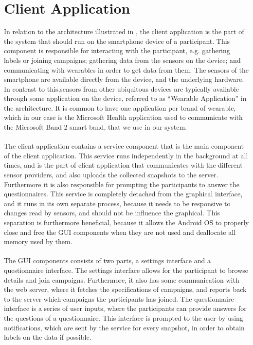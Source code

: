 
\section{Client Application}
\label{sec:client_application}

In relation to the architecture illustrated in , the client application is the part of the system that should run on the smartphone device of a participant. This component is responsible for interacting with the participant, e.g. gathering labels or joining campaigns; gathering data from the sensors on the device; and communicating with wearables in order to get data from them. The sensors of the smartphone are available directly from the device, and the underlying hardware. In contrast to this,sensors from other ubiquitous devices are typically available through some application on the device, referred to as ``Wearable Application'' in the architecture. It is common to have one application per brand of wearable, which in our case is the Microsoft Health application used to communicate with the Microsoft Band 2 smart band, that we use in our system.
\\\\
The client application contains a service component that is the main component of the client application. This service runs independently in the background at all times, and is the part of client application that communicates with the different sensor providers, and also uploads the collected snapshots to the server. Furthermore it is also responsible for prompting the participants to answer the questionnaires. This service is completely detached from the graphical interface, and it runs in its own separate process, because it needs to be responsive to changes read by sensors, and should not be influence the graphical. This separation is furthermore beneficial, because it allows the Android OS to properly close and free the GUI components when they are not used and deallocate all memory used by them. 
\\\\
The GUI components consists of two parts, a settings interface and a questionnaire interface. The settings interface allows for the participant to browse details and join campaigns. Furthermore, it also has some communication with the web server, where it fetches the specifications of campaigns, and reports back to the server which campaigns the participants has joined. The questionnaire interface is a series of user inputs, where the participants can provide answers for the questions of a questionnaire. This interface is prompted to the user by using notifications, which are sent by the service for every snapshot, in order to obtain labels on the data if possible.
